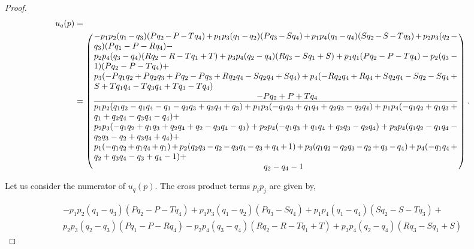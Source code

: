 \begin{proof}
\begingroup
\tiny
\begin{equation*}
    \begin{split}
    u_q(p) & = \\ 
    & = \left(
    \frac
        {\parbox{6in}{$ - p_{1} p_{2} (q_{1} - q_{3}) (P q_{2} - P - T q_{4}) + p_{1} p_{3} (q_{1} - q_{2}) (P q_{3} - S q_{4}) + p_{1} p_{4} (q_{1} - q_{4}) (S q_{2} - S - T q_{3}) + p_{2} p_{3} (q_{2} - q_{3}) (P q_{1} - P - R q_{4}) - $ \\
        $ p_{2} p_{4} (q_{3} - q_{4}) (R q_{2} - R - T q_{1} + T) + p_{3} p_{4} (q_{2} - q_{4}) (R q_{3} - S q_{1} + S) + p_{1} q_{1} (P q_{2} - P - T q_{4}) - p_{2} (q_{3} - 1) (P q_{2} - P - T q_{4}) + $ \\
        $ p_{3} (- P q_{1} q_{2} + P q_{2} q_{3} + P q_{2} - P q_{3} + R q_{2} q_{4} - S q_{2} q_{4} + S q_{4}) + p_{4} (- R q_{2} q_{4} + R q_{4} + S q_{2} q_{4} - S q_{2} - S q_{4} + S + T q_{1} q_{4} - T q_{3} q_{4} + T q_{3} - T q_{4}) $ \\
        \hspace*{6.7cm} $- P q_{2} + P + T q_{4}$
        }}
        {\parbox{6in}{$
        p_{1} p_{2} (q_{1} q_{2} - q_{1} q_{4} - q_{1} - q_{2} q_{3} + q_{3} q_{4} + q_{3}) + p_{1} p_{3} (- q_{1} q_{3} + q_{1} q_{4} + q_{2} q_{3} - q_{2} q_{4}) + p_{1} p_{4} (- q_{1} q_{2} + q_{1} q_{3} + q_{1} + q_{2} q_{4} - q_{3} q_{4} - q_{4}) +$ \\
        $ p_{2} p_{3} (- q_{1} q_{2} + q_{1} q_{3} + q_{2} q_{4} + q_{2} - q_{3} q_{4} - q_{3}) + p_{2} p_{4} (- q_{1} q_{3} + q_{1} q_{4} + q_{2} q_{3} - q_{2} q_{4}) + p_{3} p_{4} (q_{1} q_{2} - q_{1} q_{4} - q_{2} q_{3} - q_{2} + q_{3} q_{4} + q_{4}) + $ \\
        $ p_{1} (- q_{1} q_{2} + q_{1} q_{4} + q_{1}) + p_{2} (q_{2} q_{3} - q_{2} - q_{3} q_{4} - q_{3} + q_{4} + 1) + p_{3} (q_{1} q_{2} - q_{2} q_{3} - q_{2} + q_{3} - q_{4}) + p_{4} (- q_{1} q_{4} + q_{2} + q_{3} q_{4} - q_{3} + q_{4} - 1) + $ \\
        \hspace*{7cm} $q_{2} - q_{4} - 1$
    }}
    \right).
\end{split}
\end{equation*}
    \endgroup

Let us consider the numerator of \(u_q(p)\). The cross product terms
\(p_ip_j\) are given by,

\begingroup
\footnotesize
\begin{align*}
- p_{1} p_{2} (q_{1} - q_{3}) (P q_{2} - P - T q_{4}) + p_{1} p_{3} (q_{1} - q_{2}) (P q_{3} - S q_{4}) + p_{1} p_{4} (q_{1} - q_{4}) (S q_{2} - S - T q_{3}) + \\
p_{2} p_{3} (q_{2} - q_{3}) (P q_{1} - P - R q_{4}) - p_{2} p_{4} (q_{3} - q_{4}) (R q_{2} - R - T q_{1} + T) + p_{3} p_{4} (q_{2} - q_{4}) (R q_{3} - S q_{1} + S)
\end{align*}
\endgroup


\end{proof}
